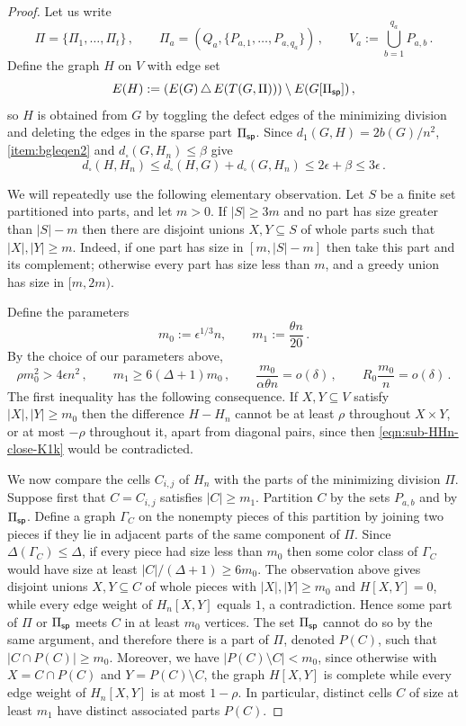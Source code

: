 \begin{proof}
Let us write
$$\Pi=\{\Pi_1,\dots,\Pi_t\}\,,\qquad \Pi_a=(Q_a,\{P_{a,1},\dots,P_{a,q_a}\})\,,\qquad V_a:=\bigcup_{b=1}^{q_a}P_{a,b}\,.$$
Define the graph $H$ on $V$ with edge set
$$E(H):=(E(G)\,\triangle\,E(T(G,\Pi)))\setminus E(G[\Pi_{\mathsf{sp}}])\,,$$
so $H$ is obtained from $G$ by toggling the defect edges of the minimizing division and deleting the edges in the sparse part $\Pi_{\mathsf{sp}}$. Since $d_1(G,H)=2b(G)/n^2$, \ref{item:bgleqen2} and $d_\square(G,H_n)\leq\beta$ give
\begin{equation}\label{eqn:sub-HHn-close-K1k}
d_\square(H,H_n)\leq d_\square(H,G)+d_\square(G,H_n)\leq2\epsilon+\beta\leq3\epsilon\,.
\end{equation}

We will repeatedly use the following elementary observation. Let $S$ be a finite set partitioned into parts, and let $m>0$. If $|S|\geq3m$ and no part has size greater than $|S|-m$ then there are disjoint unions $X,Y\subseteq S$ of whole parts such that $|X|,|Y|\geq m$. Indeed, if one part has size in $[m,|S|-m]$ then take this part and its complement; otherwise every part has size less than $m$, and a greedy union has size in $[m,2m)$.

Define the parameters
$$m_0:=\epsilon^{1/3}n,\qquad m_1:=\frac{\theta n}{20}\,.$$
By the choice of our parameters above,
\begin{equation}\label{eqn:sub-bridge-parameter-display-K1k}
\rho m_0^2>4\epsilon n^2\,,\qquad m_1\geq6(\Delta+1)m_0\,,\qquad \frac{m_0}{\alpha\theta n}=o(\delta)\,,\qquad R_0\frac{m_0}{n}=o(\delta)\,.
\end{equation}
The first inequality has the following consequence. If $X,Y\subseteq V$ satisfy $|X|,|Y|\geq m_0$ then the difference $H-H_n$ cannot be at least $\rho$ throughout $X\times Y$, or at most $-\rho$ throughout it, apart from diagonal pairs, since then \eqref{eqn:sub-HHn-close-K1k} would be contradicted.

We now compare the cells $C_{i,j}$ of $H_n$ with the parts of the minimizing division $\Pi$. Suppose first that $C=C_{i,j}$ satisfies $|C|\geq m_1$. Partition $C$ by the sets $P_{a,b}$ and by $\Pi_{\mathsf{sp}}$. Define a graph $\Gamma_C$ on the nonempty pieces of this partition by joining two pieces if they lie in adjacent parts of the same component of $\Pi$. Since $\Delta(\Gamma_C)\leq\Delta$, if every piece had size less than $m_0$ then some color class of $\Gamma_C$ would have size at least $|C|/(\Delta+1)\geq6m_0$. The observation above gives disjoint unions $X,Y\subseteq C$ of whole pieces with $|X|,|Y|\geq m_0$ and $H[X,Y]=0$, while every edge weight of $H_n[X,Y]$ equals $1$, a contradiction. Hence some part of $\Pi$ or $\Pi_{\mathsf{sp}}$ meets $C$ in at least $m_0$ vertices. The set $\Pi_{\mathsf{sp}}$ cannot do so by the same argument, and therefore there is a part of $\Pi$, denoted $P(C)$, such that $|C\cap P(C)|\geq m_0$.
Moreover, we have $|P(C)\setminus C|<m_0$, since otherwise with $X=C\cap P(C)$ and $Y=P(C)\setminus C$, the graph $H[X,Y]$ is complete while every edge weight of $H_n[X,Y]$ is at most $1-\rho$. In particular, distinct cells $C$ of size at least $m_1$ have distinct associated parts $P(C)$.


\end{proof}
